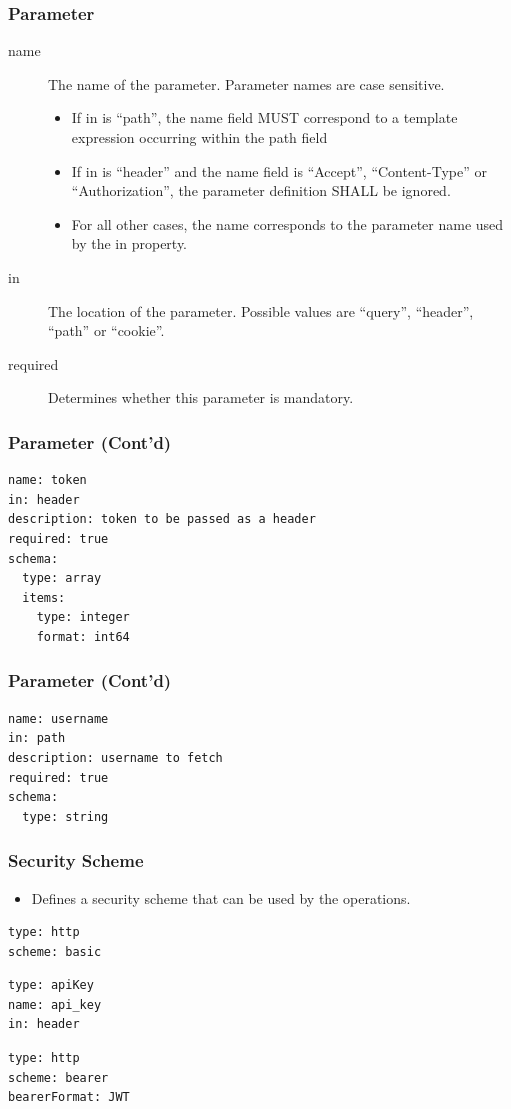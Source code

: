 \documentclass{efd-lecture}
\begin{document}
\begin{frame}
  \frametitle{Parameter}
  \begin{description}
    \item[name] The name of the parameter. Parameter names are case sensitive.
    \begin{itemize}
      \item If in is ``path'', the name field MUST correspond to a template expression occurring within the path field
      \item If in is ``header'' and the name field is ``Accept'', ``Content-Type'' or ``Authorization'', the parameter definition SHALL be ignored.
      \item For all other cases, the name corresponds to the parameter name used by the in property.
    \end{itemize}
    \item[in] The location of the parameter. Possible values are ``query'', ``header'', ``path'' or ``cookie''.
    \item[required] Determines whether this parameter is mandatory.
  \end{description}
\end{frame}

\begin{frame}[fragile]
  \frametitle{Parameter (Cont'd)}
  \begin{verbatim}
name: token
in: header
description: token to be passed as a header
required: true
schema:
  type: array
  items:
    type: integer
    format: int64
  \end{verbatim}
\end{frame}

\begin{frame}[fragile]
  \frametitle{Parameter (Cont'd)}
  \begin{verbatim}
name: username
in: path
description: username to fetch
required: true
schema:
  type: string
  \end{verbatim}
\end{frame}

\begin{frame}[fragile]
  \frametitle{Security Scheme}
  \begin{itemize}
    \item Defines a security scheme that can be used by the operations.
  \end{itemize}
  \scriptsize
  \begin{verbatim}
type: http
scheme: basic
  \end{verbatim}
  \begin{verbatim}
type: apiKey
name: api_key
in: header
  \end{verbatim}
  \begin{verbatim}
type: http
scheme: bearer
bearerFormat: JWT
  \end{verbatim}
\end{frame}
\end{document}
